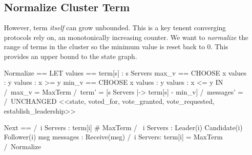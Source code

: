 \documentclass{report}
\begin{document}
\subsection{Normalize Cluster Term}

However, term \textit{itself} can grow unbounded. This is a key tenent 
converging protocols rely on, an monotonically increasing counter. We want to 
\textit{normalize} the range of terms in the cluster so the minimum value is
reset back to 0. This provides an upper bound to the state graph.\newline

\begin{tla}
Normalize == 
    LET 
        values == {term[s] : s \in Servers}
        max_v == CHOOSE x \in values : \A y \in values : x >= y
        min_v == CHOOSE x \in values : \A y \in values : x <= y
    IN 
        /\ max_v = MaxTerm
        /\ term' = [s \in Servers |-> term[s] - min_v]
        /\ messages' = {}
        /\ UNCHANGED <<state, voted_for, vote_granted, vote_requested, establish_leadership>>

Next == 
    \/ /\ \A i \in Servers : term[i] # MaxTerm 
       /\ \/ \E i \in Servers : 
                \/ Leader(i) 
                \/ Candidate(i)
                \/ Follower(i)
          \/ \E msg \in messages : Receive(msg)
    \/ /\ \E i \in Servers: term[i] = MaxTerm 
       /\ Normalize
\end{tla}
\begin{tlatex}
%
%
%
%
%
%
\@pvspace{8.0pt}%
%
%
%
%
%
%
%
\end{tlatex}
\newline
\end{document}
